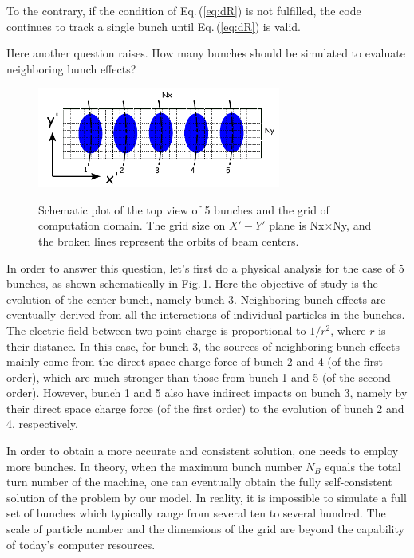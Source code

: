 \documentclass[aps,prstab,twocolumn,superscriptaddress]{revtex4}
\begin{document}
To the contrary, if the condition of Eq.\,(\ref{eq:dR}) is not fulfilled,
the code continues to track a single bunch until Eq.\,(\ref{eq:dR}) is valid.   

Here another question raises. How many bunches should be simulated to evaluate neighboring bunch effects? 
  
\begin{figure}
    {\includegraphics[width=8cm]{figures/SM-MultiBunch.pdf}}
    \caption{Schematic plot of the top view of 5 bunches and the grid of computation domain. The grid size on $X'-Y'$ plane is Nx$\times$Ny, and the broken lines represent the orbits of beam centers. }
    \label{fig:MultiBunch}
\end{figure}

In order to answer this question, let's first do a physical analysis for the case of 5 bunches, as shown schematically in Fig.\,\ref{fig:MultiBunch}.
Here the objective of study is the evolution of the center bunch, namely bunch 3. 
Neighboring bunch effects are eventually derived from all the interactions of individual particles in the bunches. 
The electric field between two point charge is proportional to $1/r^2$, where $r$ is their distance. In this case, for bunch 3, the sources
of neighboring bunch effects mainly come from the direct space charge force of bunch 2 and 4 (of the first order), which are much stronger than those from bunch 1 and 
5 (of the second order). However, bunch 1 and 5 also have indirect impacts on bunch 3, 
namely by their direct space charge force (of the first order) to the evolution of bunch 2 and 4, respectively. 

In order to obtain a more accurate and consistent solution, one needs to employ more bunches. In theory, when the maximum bunch number $N_B$ equals the total turn number of the machine, one can eventually obtain the fully self-consistent solution of the problem by our model. 
In reality, it is impossible to simulate a full set of bunches which typically range from 
several ten to several hundred.
The scale of particle number and the dimensions of the grid are beyond the capability of today's computer resources.
\end{document}

